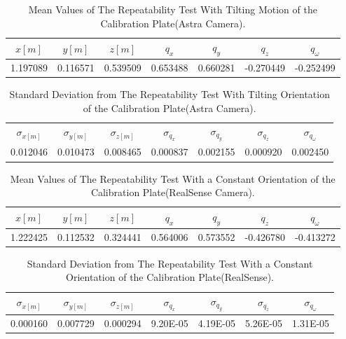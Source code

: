 \begin{table}[b]
\renewcommand{\arraystretch}{1.3}
\caption{Mean Values of The Repeatability Test With Tilting Motion of the Calibration Plate(Astra Camera).}
\label{meanastra2}
\centering
\begin{tabular}{|c||c||c||c||c||c||c|}
\hline
$x[m]$ & $y[m]$ & $z[m]$ & $q_{x}$ & $q_{y}$ & $q_{z}$ &$q_{\omega}$ \\
\hline
1.197089&	0.116571&	0.539509&
0.653488&	0.660281&	-0.270449&	-0.252499 \\
\hline
\hline
\end{tabular}
\end{table}


\begin{table}[b]
\renewcommand{\arraystretch}{1.3}
\caption{Standard Deviation from The Repeatability Test With Tilting Orientation of the Calibration Plate(Astra Camera).}
\label{standardastra2}
\centering
\begin{tabular}{|c||c||c||c||c||c||c|}
\hline
$\sigma_{x[m]}$ & $\sigma_{y[m]}$ & $\sigma_{z[m]}$ & $\sigma_{q_{x}}$ & $\sigma_{q_{y}}$ & $\sigma_{q_{z}}$ &$\sigma_{q_{\omega}}$ \\
0.012046&	0.010473&	0.008465& 0.000837&	0.002155&	0.000920&	0.002450
\\
\hline
\hline
\end{tabular}
\end{table}



\begin{table}[b]
\renewcommand{\arraystretch}{1.3}
\caption{Mean Values of The Repeatability Test With a Constant Orientation of the Calibration Plate(RealSense Camera).}
\label{meanreal1}
\centering
\begin{tabular}{|c||c||c||c||c||c||c|}
\hline
$x[m]$ & $y[m]$ & $z[m]$ & $q_{x}$ & $q_{y}$ & $q_{z}$ &$q_{\omega}$ \\
\hline
1.222425&	0.112532&	0.324441&0.564006&	0.573552&	-0.426780&	-0.413272 \\
\hline
\hline
\end{tabular}
\end{table}


\begin{table}[b]
\renewcommand{\arraystretch}{1.3}
\caption{Standard Deviation from The Repeatability Test With a Constant Orientation of the Calibration Plate(RealSense).}
\label{standardreal1}
\centering
\begin{tabular}{|c||c||c||c||c||c||c|}
\hline
$\sigma_{x[m]}$ & $\sigma_{y[m]}$ & $\sigma_{z[m]}$ & $\sigma_{q_{x}}$ & $\sigma_{q_{y}}$ & $\sigma_{q_{z}}$ &$\sigma_{q_{\omega}}$ \\
\hline
0.000160&	0.007729&	0.000294&9.20E-05&	4.19E-05&	5.26E-05&	1.31E-05\\
\hline
\hline
\end{tabular}
\end{table}


